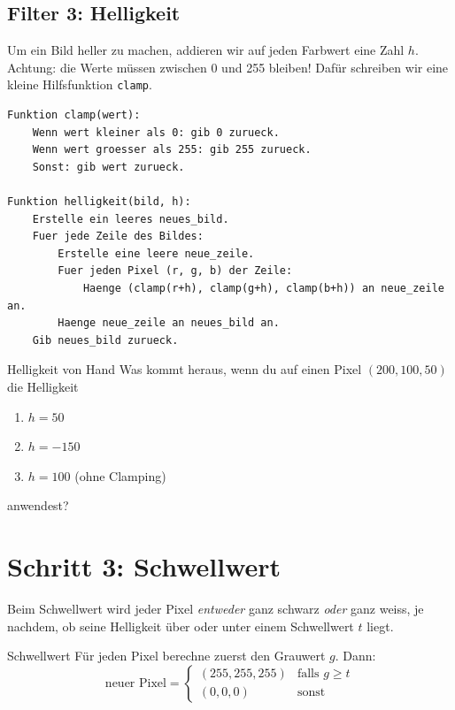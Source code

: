 
\subsection*{Filter 3: Helligkeit}

Um ein Bild heller zu machen, addieren wir auf jeden Farbwert eine Zahl
$h$. Achtung: die Werte m\"ussen zwischen 0 und 255 bleiben! Daf\"ur
schreiben wir eine kleine Hilfsfunktion \texttt{clamp}.

\begin{lstlisting}[style=pseudo]
Funktion clamp(wert):
    Wenn wert kleiner als 0: gib 0 zurueck.
    Wenn wert groesser als 255: gib 255 zurueck.
    Sonst: gib wert zurueck.

Funktion helligkeit(bild, h):
    Erstelle ein leeres neues_bild.
    Fuer jede Zeile des Bildes:
        Erstelle eine leere neue_zeile.
        Fuer jeden Pixel (r, g, b) der Zeile:
            Haenge (clamp(r+h), clamp(g+h), clamp(b+h)) an neue_zeile an.
        Haenge neue_zeile an neues_bild an.
    Gib neues_bild zurueck.
\end{lstlisting}


\begin{aufgabe}{Helligkeit von Hand}
Was kommt heraus, wenn du auf einen Pixel $(200, 100, 50)$ die Helligkeit
\begin{enumerate}
  \item $h = 50$
  \item $h = -150$
  \item $h = 100$ (ohne Clamping)
\end{enumerate}
anwendest?
\end{aufgabe}

\section{Schritt 3: Schwellwert}

Beim Schwellwert wird jeder Pixel \textit{entweder} ganz schwarz \textit{oder}
ganz weiss, je nachdem, ob seine Helligkeit \"uber oder unter einem
Schwellwert $t$ liegt.

\begin{definitionbox}{Schwellwert}
F\"ur jeden Pixel berechne zuerst den Grauwert $g$. Dann:
\[ \text{neuer Pixel} = \begin{cases}
   (255, 255, 255) & \text{falls } g \geq t \\
   (0, 0, 0) & \text{sonst}
\end{cases} \]
\end{definitionbox}

